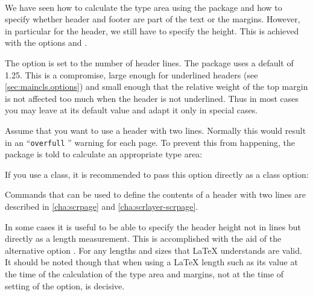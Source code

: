%
%
\begin{Declaration}
  \\
\end{Declaration}%
We have seen how to calculate the type area using the
 package and how to specify whether header and
footer are part of the text or the margins. However, in particular for
the header, we still have to specify the height. This is achieved with
the options  and
.

The option  is set to the number of header
lines. The  package uses a default of 1.25. This is
a compromise, large enough for underlined headers (see
\autoref{sec:maincls.options}) and small enough that the relative
weight of the top margin is not affected too much when the header is
not underlined. Thus in most cases you may leave  at
its default value and adapt it only in special cases.

\begin{Example}
  Assume that you want to use a header with two lines. Normally this would
  result in an ``\texttt{overfull} '' warning for each page. To
  prevent this from happening, the  package is told to
  calculate an appropriate type area:
If you use a {\KOMAScript} class, it is recommended to pass this option
directly as a class option:
Commands that can be used to define the contents of a header with two lines
are described in \autoref{cha:scrpage} and \autoref{cha:scrlayer-scrpage}.
\end{Example}

In some cases it is useful to be able to specify the header height not
in lines but directly as a length measurement. This is accomplished
with the aid of the alternative option . For
 any lengths and sizes that \LaTeX{} understands are
valid. It should be noted though that when using a \LaTeX{} length
such as  its value at the time of the calculation
of the type area and margins, not at the time of setting of the
option, is decisive.


